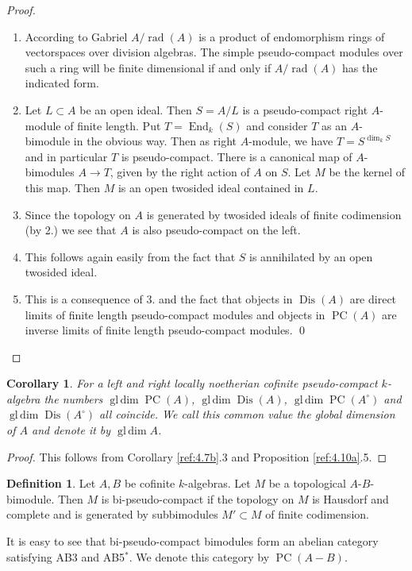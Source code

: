 \documentclass{amsproc}
\DeclareMathOperator{\Dis}{Dis}
\def\rad{\operatorname {rad}}
\def\End{\operatorname {End}}
\def\gldim{\operatorname {gl\,dim}}
\def\r{\rightarrow}
\DeclareMathOperator{\PC}{PC}
\newtheorem{corollary}[lemma]{Corollary}
\theoremstyle{definition}
\newtheorem{definition}[lemma]{Definition}
\theoremstyle{remark}
\numberwithin{equation}{section}
\numberwithin{table}{section}
\numberwithin{figure}{section}
\begin{document}
\begin{proof}
\begin{enumerate}
\item According to Gabriel $A/\rad(A)$ is a product of endomorphism
  rings of vectorspaces over division algebras. The simple
  pseudo-compact modules over such a ring will be finite dimensional if
  and only if $A/\rad(A)$ has the indicated form.
\item
Let $L\subset A$ be an open ideal. Then $S=A/L$ is a pseudo-compact
right $A$-module of finite length. Put $T=\End_k(S)$ and consider $T$ as
an $A$-bimodule in the obvious way. Then as right $A$-module, we have
$T=S^{\dim_k S}$ and in particular $T$ is pseudo-compact. There is a
canonical map of $A$-bimodules $A\r T$, given by the right action of $A$
on $S$. Let $M$ be the kernel of this map. Then $M$ is an open twosided
ideal contained in $L$.
\item Since the topology on $A$ is generated by twosided ideals of finite
codimension (by 2.) we see that $A$ is also pseudo-compact on the left.
\item This follows again easily from the fact that $S$ is annihilated by
an open twosided ideal.
\item This is a consequence of 3. and the fact that objects in
  $\Dis(A)$  are direct limits of finite length pseudo-compact modules and
  objects in $\PC(A)$ are inverse limits of  finite length
  pseudo-compact modules. 
\qed
\end{enumerate}
\def\qed{}\end{proof} 
\begin{corollary}
\label{ref:4.11a}
 For a
left and right locally noetherian cofinite pseudo-compact $k$-algebra the numbers
$\gldim \PC(A)$, $\gldim \Dis(A)$, $\gldim \PC(A^\circ)$ and $\gldim
\Dis(A^\circ)$ all coincide. 
We call this common value the global
dimension of $A$ and denote it by $\gldim A$.
\end{corollary}
\begin{proof}
This follows from
Corollary \ref{ref:4.7b}.3 and Proposition \ref{ref:4.10a}.5.
\end{proof}
\begin{definition}
\label{ref:4.12a}
  Let $A,B$ be cofinite $k$-algebras. Let $M$ be a topological
  $A$-$B$-bimodule. Then $M$ is bi-pseudo-compact if the topology on
  $M$ is Hausdorf and complete and is generated by subbimodules
  $M'\subset M$ of finite codimension.
\end{definition}
It is easy to see that bi-pseudo-compact bimodules form an abelian category
satisfying AB3 and AB5${}^\ast$. We denote this category by $\PC(A-B)$.
\end{document}
